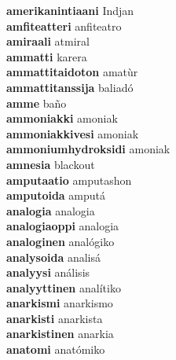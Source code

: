\textbf{amerikanintiaani } Indjan \\
\textbf{amfiteatteri } anfiteatro \\
\textbf{amiraali } atmiral \\
\textbf{ammatti } karera \\
\textbf{ammattitaidoton } amatùr \\
\textbf{ammattitanssija } baliadó \\
\textbf{amme } baño \\
\textbf{ammoniakki } amoniak \\
\textbf{ammoniakkivesi } amoniak \\
\textbf{ammoniumhydroksidi } amoniak \\
\textbf{amnesia } blackout \\
\textbf{amputaatio } amputashon \\
\textbf{amputoida } amputá \\
\textbf{analogia } analogia \\
\textbf{analogiaoppi } analogia \\
\textbf{analoginen } analógiko \\
\textbf{analysoida } analisá \\
\textbf{analyysi } análisis \\
\textbf{analyyttinen } analítiko \\
\textbf{anarkismi } anarkismo \\
\textbf{anarkisti } anarkista \\
\textbf{anarkistinen } anarkia \\
\textbf{anatomi } anatómiko \\
